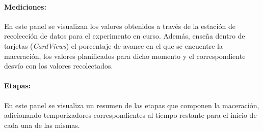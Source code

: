             \paragraph{Mediciones:}
            En este panel se visualizan los valores obtenidos a través de la estación de recolección de datos para el experimento en curso. Además, enseña dentro de tarjetas (\textit{CardViews}) el porcentaje de avance en el que se encuentre la maceración, los valores planificados para dicho momento y el correspondiente desvío con los valores recolectados.
            \paragraph{Etapas:}
            En este panel se visualiza un resumen de las etapas que componen la maceración, adicionando temporizadores correspondientes al tiempo restante para el inicio de cada una de las mismas.
            
